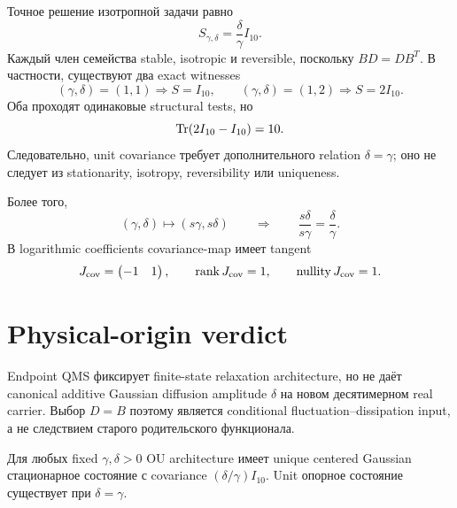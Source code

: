 Точное решение изотропной задачи равно
\begin{equation}
 S_{\gamma,\delta}=\frac{\delta}{\gamma}I_{10}.
 \label{eq:v9-gaussian-reference-covariance-family}
\end{equation}
Каждый член семейства stable, isotropic и reversible, поскольку
$BD=DB^T$. В частности, существуют два exact witnesses
\begin{equation}
 (\gamma,\delta)=(1,1)\Longrightarrow S=I_{10},
 \qquad
 (\gamma,\delta)=(1,2)\Longrightarrow S=2I_{10}.
 \label{eq:v9-gaussian-reference-two-witnesses}
\end{equation}
Оба проходят одинаковые structural tests, но
\begin{equation}
 \operatorname{Tr}(2I_{10}-I_{10})=10.
 \label{eq:v9-gaussian-reference-witness-separation}
\end{equation}
Следовательно, unit covariance требует дополнительного relation
$\delta=\gamma$; оно не следует из stationarity, isotropy, reversibility
или uniqueness.

Более того,
\begin{equation}
 (\gamma,\delta)\longmapsto(s\gamma,s\delta)
 \qquad\Longrightarrow\qquad
 \frac{s\delta}{s\gamma}=\frac{\delta}{\gamma}.
 \label{eq:v9-gaussian-reference-common-rescaling}
\end{equation}
В logarithmic coefficients covariance-map имеет tangent
\begin{equation}
 J_{\rm cov}=\begin{pmatrix}-1&1\end{pmatrix},
 \qquad \operatorname{rank} J_{\rm cov}=1,
 \qquad \operatorname{nullity}J_{\rm cov}=1.
 \label{eq:v9-gaussian-reference-ratio-orbit}
\end{equation}

\section{Physical-origin verdict}

Endpoint QMS фиксирует finite-state relaxation architecture, но не даёт
canonical additive Gaussian diffusion amplitude $\delta$ на новом
десятимерном real carrier. Выбор $D=B$ поэтому является conditional
fluctuation--dissipation input, а не следствием старого родительского функционала.

\begin{theorem}
Для любых fixed $\gamma,\delta>0$ OU architecture имеет unique centered
Gaussian стационарное состояние с covariance $(\delta/\gamma)I_{10}$. Unit
опорное состояние существует при $\delta=\gamma$.
\end{theorem}

